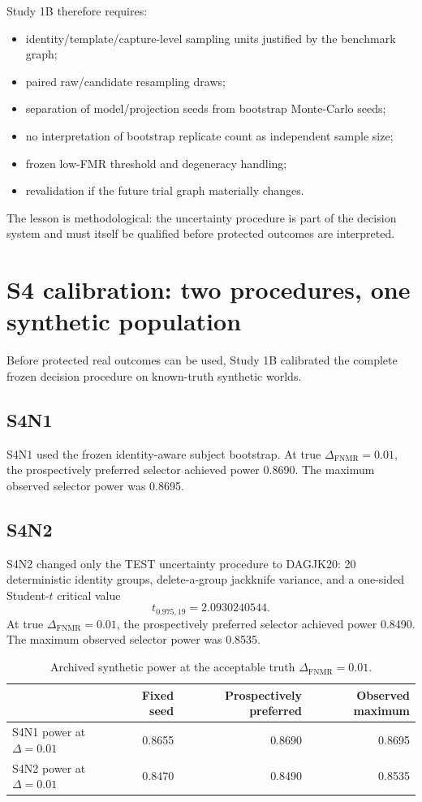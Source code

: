 \documentclass[10pt,a4paper]{article}
\newcommand{\fnmr}{\mathrm{FNMR}}
\newcommand{\DeltaFNMR}{\Delta_{\fnmr}}
\begin{document}
Study 1B therefore requires:

\begin{itemize}
\item identity/template/capture-level sampling units justified by the benchmark graph;
\item paired raw/candidate resampling draws;
\item separation of model/projection seeds from bootstrap Monte-Carlo seeds;
\item no interpretation of bootstrap replicate count as independent sample size;
\item frozen low-FMR threshold and degeneracy handling;
\item revalidation if the future trial graph materially changes.
\end{itemize}

The lesson is methodological: the uncertainty procedure is part of the decision system and must itself be
qualified before protected outcomes are interpreted.

\section{S4 calibration: two procedures, one synthetic population}

Before protected real outcomes can be used, Study 1B calibrated the complete frozen decision procedure on
known-truth synthetic worlds.

\subsection{S4N1}

S4N1 used the frozen identity-aware subject bootstrap. At true $\DeltaFNMR=0.01$, the prospectively preferred
selector achieved power 0.8690. The maximum observed selector power was 0.8695.

\subsection{S4N2}

S4N2 changed only the TEST uncertainty procedure to DAGJK20: 20 deterministic identity groups, delete-a-group
jackknife variance, and a one-sided Student-$t$ critical value
\[
t_{0.975,19}=2.0930240544.
\]
At true $\DeltaFNMR=0.01$, the prospectively preferred selector achieved power 0.8490. The maximum observed
selector power was 0.8535.

\begin{table}[ht]
\centering
\begin{tabular}{lrrr}
\toprule
 & \textbf{Fixed seed} & \textbf{Prospectively preferred} & \textbf{Observed maximum}\\
\midrule
S4N1 power at $\Delta=0.01$ & 0.8655 & 0.8690 & 0.8695\\
S4N2 power at $\Delta=0.01$ & 0.8470 & 0.8490 & 0.8535\\
\bottomrule
\end{tabular}
\caption{Archived synthetic power at the acceptable truth $\DeltaFNMR=0.01$.}
\end{table}
\end{document}
